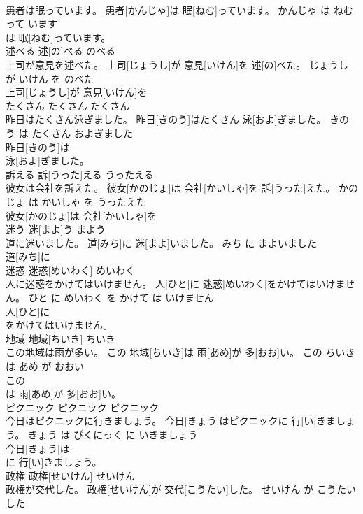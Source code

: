 \documentclass[8pt]{extreport}
\begin{document}
\begin{CJK}{UTF8}{min}
\\	患者は眠っています。	患者[かんじゃ]は 眠[ねむ]っています。	かんじゃ は ねむって います	
\\	は 眠[ねむ]っています。		
\\	述べる	述[の]べる	のべる	
\\	上司が意見を述べた。	上司[じょうし]が 意見[いけん]を 述[の]べた。	じょうし が いけん を のべた	
\\	上司[じょうし]が 意見[いけん]を
\\	たくさん	たくさん	たくさん	
\\	昨日はたくさん泳ぎました。	昨日[きのう]はたくさん 泳[およ]ぎました。	きのう は たくさん およぎました	
\\	昨日[きのう]は
\\	泳[およ]ぎました。		
\\	訴える	訴[うった]える	うったえる	
\\	彼女は会社を訴えた。	彼女[かのじょ]は 会社[かいしゃ]を 訴[うった]えた。	かのじょ は かいしゃ を うったえた	
\\	彼女[かのじょ]は 会社[かいしゃ]を
\\	迷う	迷[まよ]う	まよう	
\\	道に迷いました。	道[みち]に 迷[まよ]いました。	みち に まよいました	
\\	道[みち]に
\\	迷惑	迷惑[めいわく]	めいわく	
\\	人に迷惑をかけてはいけません。	人[ひと]に 迷惑[めいわく]をかけてはいけません。	ひと に めいわく を かけて は いけません	
\\	人[ひと]に
\\	をかけてはいけません。		
\\	地域	地域[ちいき]	ちいき	
\\	この地域は雨が多い。	この 地域[ちいき]は 雨[あめ]が 多[おお]い。	この ちいき は あめ が おおい	
\\	この
\\	は 雨[あめ]が 多[おお]い。		
\\	ピクニック	ピクニック	ピクニック	
\\	今日はピクニックに行きましょう。	今日[きょう]はピクニックに 行[い]きましょう。	きょう は ぴくにっく に いきましょう	
\\	今日[きょう]は
\\	に 行[い]きましょう。		
\\	政権	政権[せいけん]	せいけん	
\\	政権が交代した。	政権[せいけん]が 交代[こうたい]した。	せいけん が こうたい した	

\end{CJK}
\end{document}
